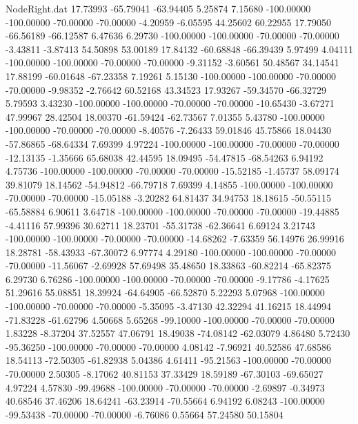 \begin{filecontents}{NodeRight.dat}
  17.73993  -65.79041  -63.94405     5.25874    7.15680 -100.00000 -100.00000  -70.00000  -70.00000   -4.20959   -6.05595   44.25602   60.22955
  17.79050  -66.56189  -66.12587     6.47636    6.29730 -100.00000 -100.00000  -70.00000  -70.00000   -3.43811   -3.87413   54.50898   53.00189
  17.84132  -60.68848  -66.39439     5.97499    4.04111 -100.00000 -100.00000  -70.00000  -70.00000   -9.31152   -3.60561   50.48567   34.14541
  17.88199  -60.01648  -67.23358     7.19261    5.15130 -100.00000 -100.00000  -70.00000  -70.00000   -9.98352   -2.76642   60.52168   43.34523
  17.93267  -59.34570  -66.32729     5.79593    3.43230 -100.00000 -100.00000  -70.00000  -70.00000  -10.65430   -3.67271   47.99967   28.42504
  18.00370  -61.59424  -62.73567     7.01355    5.43780 -100.00000 -100.00000  -70.00000  -70.00000   -8.40576   -7.26433   59.01846   45.75866
  18.04430  -57.86865  -68.64334     7.69399    4.97224 -100.00000 -100.00000  -70.00000  -70.00000  -12.13135   -1.35666   65.68038   42.44595
  18.09495  -54.47815  -68.54263     6.94192    4.75736 -100.00000 -100.00000  -70.00000  -70.00000  -15.52185   -1.45737   58.09174   39.81079
  18.14562  -54.94812  -66.79718     7.69399    4.14855 -100.00000 -100.00000  -70.00000  -70.00000  -15.05188   -3.20282   64.81437   34.94753
  18.18615  -50.55115  -65.58884     6.90611    3.64718 -100.00000 -100.00000  -70.00000  -70.00000  -19.44885   -4.41116   57.99396   30.62711
  18.23701  -55.31738  -62.36641     6.69124    3.21743 -100.00000 -100.00000  -70.00000  -70.00000  -14.68262   -7.63359   56.14976   26.99916
  18.28781  -58.43933  -67.30072     6.97774    4.29180 -100.00000 -100.00000  -70.00000  -70.00000  -11.56067   -2.69928   57.69498   35.48650
  18.33863  -60.82214  -65.82375     6.29730    6.76286 -100.00000 -100.00000  -70.00000  -70.00000   -9.17786   -4.17625   51.29616   55.08851
  18.39924  -64.64905  -66.52870     5.22293    5.07968 -100.00000 -100.00000  -70.00000  -70.00000   -5.35095   -3.47130   42.32294   41.16215
  18.44994  -71.83228  -61.62796     4.50668    5.65268  -99.10000 -100.00000  -70.00000  -70.00000    1.83228   -8.37204   37.52557   47.06791
  18.49038  -74.08142  -62.03079     4.86480    5.72430  -95.36250 -100.00000  -70.00000  -70.00000    4.08142   -7.96921   40.52586   47.68586
  18.54113  -72.50305  -61.82938     5.04386    4.61411  -95.21563 -100.00000  -70.00000  -70.00000    2.50305   -8.17062   40.81153   37.33429
  18.59189  -67.30103  -69.65027     4.97224    4.57830  -99.49688 -100.00000  -70.00000  -70.00000   -2.69897   -0.34973   40.68546   37.46206
  18.64241  -63.23914  -70.55664     6.94192    6.08243 -100.00000  -99.53438  -70.00000  -70.00000   -6.76086    0.55664   57.24580   50.15804

\end{filecontents}
